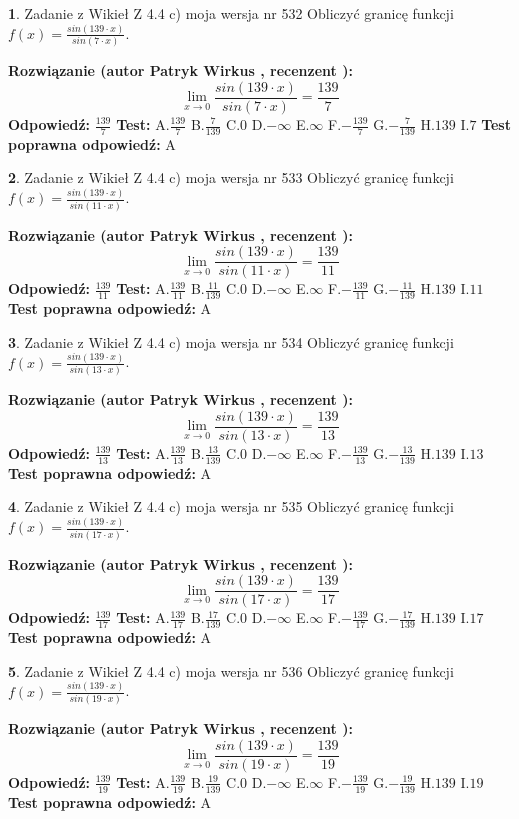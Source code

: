 \documentclass[12pt, a4paper]{article}
\theoremstyle{definition} %
\newtheorem{zad}{}
\newcommand{\zadStart}[1]{\begin{zad}#1\newline}
\newcommand{\zadStop}{\end{zad}}
\newcommand{\rozwStart}[2]{\noindent \textbf{Rozwiązanie (autor #1 , recenzent #2): }\newline}
\newcommand{\rozwStop}{\newline}
\newcommand{\odpStart}{\noindent \textbf{Odpowiedź:}\newline}
\newcommand{\odpStop}{\newline}
\newcommand{\testStart}{\noindent \textbf{Test:}\newline}
\newcommand{\testStop}{\newline}
\newcommand{\kluczStart}{\noindent \textbf{Test poprawna odpowiedź:}\newline}
\newcommand{\kluczStop}{\newline}
\begin{document}
\zadStart{Zadanie z Wikieł Z 4.4 c) moja wersja nr 532}
Obliczyć granicę funkcji $f(x)=\frac{sin(139\cdot x)}{sin(7\cdot x)}$.
\zadStop
\rozwStart{Patryk Wirkus}{}
$$\lim\limits_{x\to 0}\frac{sin(139\cdot x)}{sin(7\cdot x)}=
\frac{139}{7}$$
\rozwStop
\odpStart
$\frac{139}{7}$
\odpStop
\testStart
A.$\frac{139}{7}$
B.$\frac{7}{139}$
C.$0$
D.$-\infty$
E.$\infty$
F.$-\frac{139}{7}$
G.$-\frac{7}{139}$
H.$139$
I.$7$
\testStop
\kluczStart
A
\kluczStop



\zadStart{Zadanie z Wikieł Z 4.4 c) moja wersja nr 533}
Obliczyć granicę funkcji $f(x)=\frac{sin(139\cdot x)}{sin(11\cdot x)}$.
\zadStop
\rozwStart{Patryk Wirkus}{}
$$\lim\limits_{x\to 0}\frac{sin(139\cdot x)}{sin(11\cdot x)}=
\frac{139}{11}$$
\rozwStop
\odpStart
$\frac{139}{11}$
\odpStop
\testStart
A.$\frac{139}{11}$
B.$\frac{11}{139}$
C.$0$
D.$-\infty$
E.$\infty$
F.$-\frac{139}{11}$
G.$-\frac{11}{139}$
H.$139$
I.$11$
\testStop
\kluczStart
A
\kluczStop



\zadStart{Zadanie z Wikieł Z 4.4 c) moja wersja nr 534}
Obliczyć granicę funkcji $f(x)=\frac{sin(139\cdot x)}{sin(13\cdot x)}$.
\zadStop
\rozwStart{Patryk Wirkus}{}
$$\lim\limits_{x\to 0}\frac{sin(139\cdot x)}{sin(13\cdot x)}=
\frac{139}{13}$$
\rozwStop
\odpStart
$\frac{139}{13}$
\odpStop
\testStart
A.$\frac{139}{13}$
B.$\frac{13}{139}$
C.$0$
D.$-\infty$
E.$\infty$
F.$-\frac{139}{13}$
G.$-\frac{13}{139}$
H.$139$
I.$13$
\testStop
\kluczStart
A
\kluczStop



\zadStart{Zadanie z Wikieł Z 4.4 c) moja wersja nr 535}
Obliczyć granicę funkcji $f(x)=\frac{sin(139\cdot x)}{sin(17\cdot x)}$.
\zadStop
\rozwStart{Patryk Wirkus}{}
$$\lim\limits_{x\to 0}\frac{sin(139\cdot x)}{sin(17\cdot x)}=
\frac{139}{17}$$
\rozwStop
\odpStart
$\frac{139}{17}$
\odpStop
\testStart
A.$\frac{139}{17}$
B.$\frac{17}{139}$
C.$0$
D.$-\infty$
E.$\infty$
F.$-\frac{139}{17}$
G.$-\frac{17}{139}$
H.$139$
I.$17$
\testStop
\kluczStart
A
\kluczStop



\zadStart{Zadanie z Wikieł Z 4.4 c) moja wersja nr 536}
Obliczyć granicę funkcji $f(x)=\frac{sin(139\cdot x)}{sin(19\cdot x)}$.
\zadStop
\rozwStart{Patryk Wirkus}{}
$$\lim\limits_{x\to 0}\frac{sin(139\cdot x)}{sin(19\cdot x)}=
\frac{139}{19}$$
\rozwStop
\odpStart
$\frac{139}{19}$
\odpStop
\testStart
A.$\frac{139}{19}$
B.$\frac{19}{139}$
C.$0$
D.$-\infty$
E.$\infty$
F.$-\frac{139}{19}$
G.$-\frac{19}{139}$
H.$139$
I.$19$
\testStop
\kluczStart
A
\kluczStop
\end{document}
